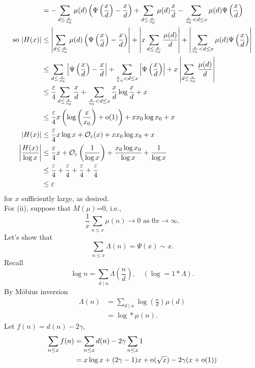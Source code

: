 \documentclass[12pt]{article}
\begin{document}
{\begin{align*}
        &=-\sum_{d\leq\frac{x}{x_0}}\mu(d)\left(\Psi\left(\frac{x}{d}\right)-\frac{x}{d}\right)+\sum_{d\leq\frac{x}{x_0}}\mu(d)\frac{x}{d}-\sum_{\frac{x}{x_0}<d\leq x}\mu(d)\Psi\left(\frac{x}{d}\right)\\
        \text{so }|H(x)|&\leq\left|\sum_{d\leq\frac{x}{x_0}}\mu(d)\left(\Psi\left(\frac{x}{d}\right)-\frac{x}{d}\right)\right|+\left|x\sum_{d\leq\frac{x}{x_0}}\frac{\mu(d)}{d}\right|+\left|\sum_{\frac{x}{x_0}<d\leq x}\mu(d)\Psi\left(\frac{x}{d}\right)\right|\\
        &\leq\sum_{d\leq\frac{x}{x_0}}\left|\Psi\left(\frac{x}{d}\right)-\frac{x}{d}\right|+\sum_{\frac{x}{x}_0<d\leq x}\left|\Psi\left(\frac{x}{d}\right)\right|+x\left|\sum_{d\leq\frac{x}{x_0}}\frac{\mu(d)}{d}\right|\\
        &\leq\frac{\varepsilon}{4}\sum_{d\leq\frac{x}{x_0}}\frac{x}{d}+\sum_{\frac{x}{x_0}<d\leq x}\frac{x}{d}\log\frac{x}{d}+x\\
        &\leq\frac{\varepsilon}{4}x\left(\log\left(\frac{x}{x_0}\right)+\text{o}(1)\right)+xx_0\log x_0+x\\
        |H(x)|&\leq\frac{\varepsilon}{4}x\log x+\mathcal{O}_{\varepsilon}(x)+xx_0\log x_0+x\\
        \left|\frac{H(x)}{\log x}\right|&\leq\frac{\varepsilon}{4}x+\mathcal{O}_{\varepsilon}\left(\frac{1}{\log x}\right)+\frac{x_0\log x_0}{\log x}+\frac{1}{\log x}\\
        &\leq\frac{\varepsilon}{4}+\frac{\varepsilon}{4}+\frac{\varepsilon}{4}+\frac{\varepsilon}{4}\\
        &\leq\varepsilon
    \end{align*}
    for $x$ sufficiently large, as desired.\\
    For (ii), suppose that $M(\mu)$=0, i.e.,
    \[
        \frac{1}{x}\sum_{n\leq x}\mu(n)\to0\text{ as }0x\to\infty.
    \]
    Let's show that
    \[
        \sum_{n\leq x}\Lambda(n)=\Psi(x)\sim x.
    \]
    Recall
    \[
        \log n=\sum_{d\mid n}\Lambda\left(\frac{n}{d}\right),\quad (\log=1\ast\Lambda).
    \]
    By M{\"o}bius inversion
    \begin{align*}
        \Lambda(n)&=\sum_{d\mid n}\log\left(\frac{n}{d}\right)\mu(d)\\
        &=\log\ast\mu(n).
    \end{align*}
    Let $f(n)=d(n)-2\gamma$,
    \begin{align*}
        \sum_{n\leq x}f(n)&=\sum_{n\leq x}d(n)-2\gamma\sum_{n\leq x}1\\
        &=x\log x+(2\gamma-1)x+\oh(\sqrt{x})-2\gamma(x+\oh(1))\\

\end{align*}}
\end{document}
